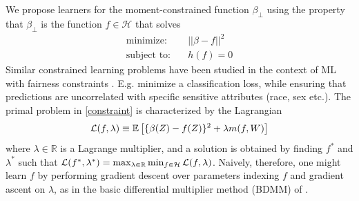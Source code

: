 We propose learners for the moment-constrained function $\beta_\perp$ using the property that $\beta_\perp$ is the function $f\in\mathcal{H}$ that solves
\begin{align}
    \text{minimize:}& \quad ||\beta - f||^2\nonumber \\
    \text{subject to:}& \quad h(f) = 0 \label{constraint}
\end{align}
Similar constrained learning problems have been studied in the context of ML with fairness constraints \citep{Nabi2024}. E.g. \cite{Zafar2017, Akhtar2021} minimize a classification loss, while ensuring that predictions are uncorrelated with specific sensitive attributes (race, sex etc.). The primal problem in \eqref{constraint} is characterized by the Lagrangian
\begin{align}
    \mathcal{L}(f, \lambda) \equiv \mathbb{E}\left[\{\beta(Z) - f(Z)\}^2 + \lambda m(f, W)\right] \label{pop_lagrangian}
\end{align}
where $\lambda \in \mathbb{R}$ is a Lagrange multiplier, 
and a solution is obtained by finding $f^*$ and $\lambda^*$ such that $\mathcal{L}(f^*, \lambda^*) =\max_{\lambda \in {\mathbb{R}}} \min_{f \in \mathcal{H}} \mathcal{L}(f, \lambda)$. Naively, therefore, one might learn $f$ by performing gradient descent over parameters indexing $f$ and gradient ascent on $\lambda$, as in the basic differential multiplier method (BDMM) of \cite{Platt1987}.

